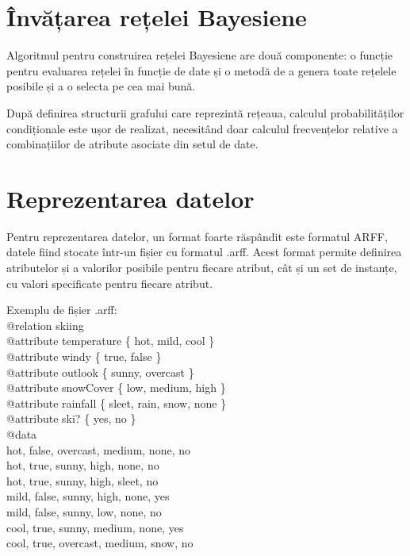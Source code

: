 \section{Învățarea rețelei Bayesiene}

Algoritmul pentru construirea rețelei Bayesiene are două componente: o funcție pentru evaluarea rețelei în funcție de date și o metodă de a genera toate rețelele posibile și a o selecta pe cea mai bună.

După definirea structurii grafului care reprezintă rețeaua, calculul probabilităților condiționale este ușor de realizat, necesitând doar calculul frecvențelor relative a combinațiilor de atribute asociate din setul de date.

\section{Reprezentarea datelor}

Pentru reprezentarea datelor, un format foarte răspândit este formatul ARFF, datele fiind stocate într-un fișier cu formatul .arff. Acest format permite definirea atributelor și a valorilor posibile pentru fiecare atribut, cât și un set de instanțe, cu valori specificate pentru fiecare atribut.

Exemplu de fișier .arff:\\
@relation skiing \\
@attribute temperature \{ hot, mild, cool \}\\
@attribute windy \{ true, false \}\\
@attribute outlook \{ sunny, overcast \}\\
@attribute snowCover \{ low, medium, high \}\\
@attribute rainfall \{ sleet, rain, snow, none \}\\
@attribute ski? \{ yes, no \}\\
@data\\
hot, false, overcast, medium, none, no\\
hot, true, sunny, high, none, no\\
hot, true, sunny, high, sleet, no\\
mild, false, sunny, high, none, yes\\
mild, false, sunny, low, none, no\\
cool, true, sunny, medium, none, yes\\
cool, true, overcast, medium, snow, no\\

